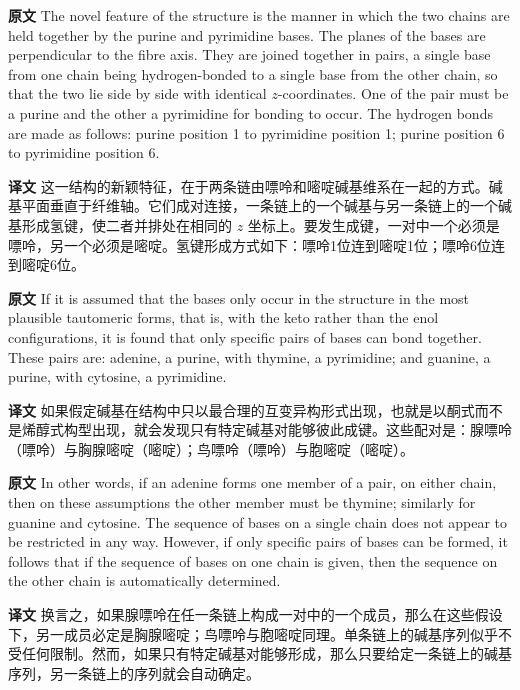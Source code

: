\documentclass[UTF8,zihao=-4]{ctexart}
\newcommand{\BodyFont}{\fontsize{10.5pt}{15.5pt}\selectfont}
\renewenvironment{quote}{\par\noindent\begingroup\BodyFont}{\par\endgroup}
\begin{document}
\begin{quote}
\noindent\textbf{原文} The novel feature of the structure is the manner in which the two chains are held together by the purine and pyrimidine bases. The planes of the bases are perpendicular to the fibre axis. They are joined together in pairs, a single base from one chain being hydrogen-bonded to a single base from the other chain, so that the two lie side by side with identical \(z\)-coordinates. One of the pair must be a purine and the other a pyrimidine for bonding to occur. The hydrogen bonds are made as follows: purine position 1 to pyrimidine position 1; purine position 6 to pyrimidine position 6.

\smallskip
\noindent\textbf{译文} 这一结构的新颖特征，在于两条链由嘌呤和嘧啶碱基维系在一起的方式。碱基平面垂直于纤维轴。它们成对连接，一条链上的一个碱基与另一条链上的一个碱基形成氢键，使二者并排处在相同的 \(z\) 坐标上。要发生成键，一对中一个必须是嘌呤，另一个必须是嘧啶。氢键形成方式如下：嘌呤1位连到嘧啶1位；嘌呤6位连到嘧啶6位。
\end{quote}

\begin{quote}
\noindent\textbf{原文} If it is assumed that the bases only occur in the structure in the most plausible tautomeric forms, that is, with the keto rather than the enol configurations, it is found that only specific pairs of bases can bond together. These pairs are: adenine, a purine, with thymine, a pyrimidine; and guanine, a purine, with cytosine, a pyrimidine.

\smallskip
\noindent\textbf{译文} 如果假定碱基在结构中只以最合理的互变异构形式出现，也就是以酮式而不是烯醇式构型出现，就会发现只有特定碱基对能够彼此成键。这些配对是：腺嘌呤（嘌呤）与胸腺嘧啶（嘧啶）；鸟嘌呤（嘌呤）与胞嘧啶（嘧啶）。
\end{quote}

\begin{quote}
\noindent\textbf{原文} In other words, if an adenine forms one member of a pair, on either chain, then on these assumptions the other member must be thymine; similarly for guanine and cytosine. The sequence of bases on a single chain does not appear to be restricted in any way. However, if only specific pairs of bases can be formed, it follows that if the sequence of bases on one chain is given, then the sequence on the other chain is automatically determined.

\smallskip
\noindent\textbf{译文} 换言之，如果腺嘌呤在任一条链上构成一对中的一个成员，那么在这些假设下，另一成员必定是胸腺嘧啶；鸟嘌呤与胞嘧啶同理。单条链上的碱基序列似乎不受任何限制。然而，如果只有特定碱基对能够形成，那么只要给定一条链上的碱基序列，另一条链上的序列就会自动确定。
\end{quote}
\end{document}
